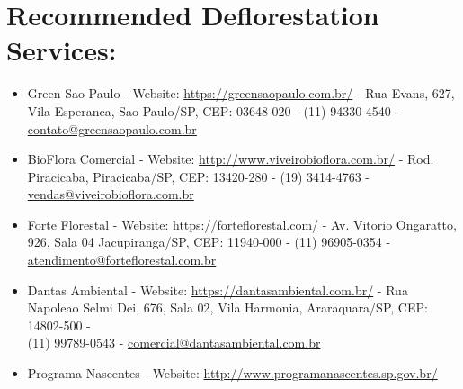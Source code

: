 \documentclass{article}
\begin{document}
    \section{Recommended Deflorestation Services:}
    \begin{itemize}
        \item Green Sao Paulo - Website: \url{https://greensaopaulo.com.br/} - Rua Evans, 627, Vila Esperanca, Sao Paulo/SP, CEP: 03648-020 - (11) 94330-4540 - \href{mailto:contato@greensaopaulo.com.br}{contato@greensaopaulo.com.br}
        \item BioFlora Comercial - Website: \url{http://www.viveirobioflora.com.br/} - Rod. Piracicaba, Piracicaba/SP, CEP: 13420-280 - (19) 3414-4763 - \href{mailto:vendas@viveirobioflora.com.br}{vendas@viveirobioflora.com.br}
        \item Forte Florestal - Website: \url{https://forteflorestal.com/} - Av. Vitorio Ongaratto, 926, Sala 04 Jacupiranga/SP, CEP: 11940-000 -  (11) 96905-0354 - \href{mailto:atendimento@forteflorestal.com.br}{atendimento@forteflorestal.com.br}
        \item Dantas Ambiental - Website: \url{https://dantasambiental.com.br/} - Rua Napoleao Selmi Dei, 676, Sala 02, Vila Harmonia, Araraquara/SP, CEP: 14802-500 -\\ (11) 99789-0543 - \href{mailto:comercial@dantasambiental.com.br}{comercial@dantasambiental.com.br}
        \item Programa Nascentes - Website: \url{http://www.programanascentes.sp.gov.br/}


        
    \end{itemize}

    \vspace{25pt}


    
\end{document}
